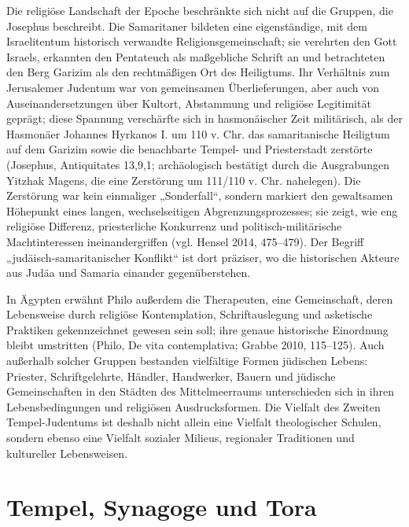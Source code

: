 \documentclass[fontsize=12pt]{mybib}
\begin{document}
Die religiöse Landschaft der Epoche beschränkte sich nicht auf die Gruppen, die Josephus beschreibt. Die Samaritaner bildeten eine eigenständige, mit dem Israelitentum historisch verwandte Religionsgemeinschaft; sie verehrten den Gott Israels, erkannten den Pentateuch als maßgebliche Schrift an und betrachteten den Berg Garizim als den rechtmäßigen Ort des Heiligtums. Ihr Verhältnis zum Jerusalemer Judentum war von gemeinsamen Überlieferungen, aber auch von Auseinandersetzungen über Kultort, Abstammung und religiöse Legitimität geprägt; diese Spannung verschärfte sich in hasmonäischer Zeit militärisch, als der Hasmonäer Johannes Hyrkanos I. um 110 v. Chr. das samaritanische Heiligtum auf dem Garizim sowie die benachbarte Tempel- und Priesterstadt zerstörte (Josephus, Antiquitates 13,9,1; archäologisch bestätigt durch die Ausgrabungen Yitzhak Magens, die eine Zerstörung um 111/110 v. Chr. nahelegen). Die Zerstörung war kein einmaliger „Sonderfall“, sondern markiert den gewaltsamen Höhepunkt eines langen, wechselseitigen Abgrenzungsprozesses; sie zeigt, wie eng religiöse Differenz, priesterliche Konkurrenz und politisch-militärische Machtinteressen ineinandergriffen (vgl. Hensel 2014, 475–479). Der Begriff „judäisch-samaritanischer Konflikt“ ist dort präziser, wo die historischen Akteure aus Judäa und Samaria einander gegenüberstehen.

In Ägypten erwähnt Philo außerdem die Therapeuten, eine Gemeinschaft, deren Lebensweise durch religiöse Kontemplation, Schriftauslegung und asketische Praktiken gekennzeichnet gewesen sein soll; ihre genaue historische Einordnung bleibt umstritten (Philo, De vita contemplativa; Grabbe 2010, 115–125). Auch außerhalb solcher Gruppen bestanden vielfältige Formen jüdischen Lebens: Priester, Schriftgelehrte, Händler, Handwerker, Bauern und jüdische Gemeinschaften in den Städten des Mittelmeerraums unterschieden sich in ihren Lebensbedingungen und religiösen Ausdrucksformen. Die Vielfalt des Zweiten Tempel-Judentums ist deshalb nicht allein eine Vielfalt theologischer Schulen, sondern ebenso eine Vielfalt sozialer Milieus, regionaler Traditionen und kultureller Lebensweisen.

\section{Tempel, Synagoge und Tora}
\end{document}
